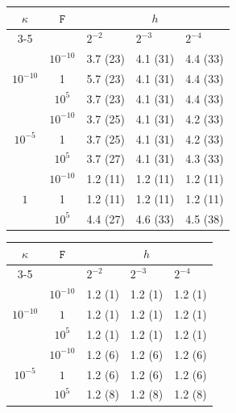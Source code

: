 \documentclass[11pt, reqno, a4paper, twoside]{article}
\newcommand{\rF}{\mathtt{F}}
\numberwithin{equation}{section}
\numberwithin{remark}{section}
\numberwithin{figure}{section}
\numberwithin{table}{section}
\begin{document}
  \begin{table}[t!]
\centering
{\footnotesize \begin{minipage}{0.48\textwidth}
\centering
\begin{tabular}{|c | c | l l l|}
\hline
$\kappa$ & $\rF$ & \multicolumn{3}{c|}{$h$} \\
\cline{3-5}
 & & $2^{-2}$ & $2^{-3}$ & $2^{-4}$ \\
\hline

\multirow{3}{*}{$10^{-10}$}
& $10^{-10}$ & 3.7 (23) & 4.1 (31) & 4.4 (33) \\
& 1 & 5.7 (23) & 4.1 (31) & 4.4 (33) \\
& $10^{5}$ & 3.7 (23) & 4.1 (31) & 4.4 (33) \\

\hline

\multirow{3}{*}{$10^{-5}$}
& $10^{-10}$ & 3.7 (25) & 4.1 (31) & 4.2 (33) \\
& 1 & 3.7 (25) & 4.1 (31) & 4.2 (33) \\
& $10^{5}$ & 3.7 (27) & 4.1 (31) & 4.3 (33) \\

\hline

\multirow{3}{*}{$1$}
& $10^{-10}$ & 1.2 (11) & 1.2 (11) & 1.2 (11) \\
& 1 & 1.2 (11) & 1.2 (11) & 1.2 (11) \\
& $10^{5}$ & 4.4 (27) & 4.6 (33) & 4.5 (38) \\

\hline
\end{tabular}
\end{minipage}
\hfill
\begin{minipage}{0.48\textwidth}
\centering
\begin{tabular}{|c | c | l l l|}
\hline
$\kappa$ & $\rF$ & \multicolumn{3}{c|}{$h$} \\
\cline{3-5}
 & & $2^{-2}$ & $2^{-3}$ & $2^{-4}$ \\
\hline

\multirow{3}{*}{$10^{-10}$}
& $10^{-10}$ & 1.2 (1) & 1.2 (1) & 1.2 (1) \\
& $1$        & 1.2 (1) & 1.2 (1) & 1.2 (1) \\
& $10^{5}$   & 1.2 (1) & 1.2 (1) & 1.2 (1) \\

\hline

\multirow{3}{*}{$10^{-5}$}
& $10^{-10}$ & 1.2 (6) & 1.2 (6) & 1.2 (6) \\
& $1$        & 1.2 (6) & 1.2 (6) & 1.2 (6) \\
& $10^{5}$   & 1.2 (8) & 1.2 (8) & 1.2 (8) \\


\end{tabular}
\end{minipage}}
\end{table}
\end{document}
